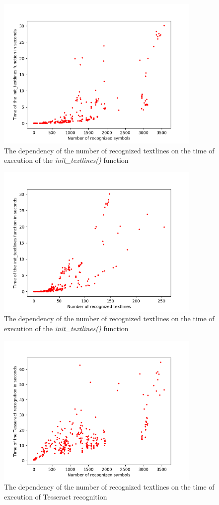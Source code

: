 \begin{figure}
\centering
\includegraphics[height=20em]{img/results/symbolsTimeInit.png}
\caption{The dependency of the number of recognized textlines on the time of execution of the \emph{init\_textlines()} function}
\label{fig:symbolsTimeInit}
\end{figure}

\begin{figure}
\centering
\includegraphics[height=20em]{img/results/textlinesTimeInit.png}
\caption{The dependency of the number of recognized textlines on the time of execution of the \emph{init\_textlines()} function}
\label{fig:textlinesTimeInit}
\end{figure}

\begin{figure}
\centering
\includegraphics[height=20em]{img/results/symbolsTimeTesseract.png}
\caption{The dependency of the number of recognized textlines on the time of execution of Tesseract recognition}
\label{fig:symbolsTimeTess}
\end{figure}

